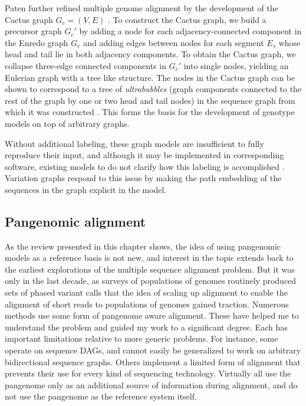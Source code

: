 \documentclass[a4paper,12pt,numbered,oneside]{Classes/PhDThesisPSnPDF}
\begin{document}
Paten further refined multiple genome alignment by the development of the Cactus graph $G_c = (V,E)$ \cite{paten2011cactus}.
To construct the Cactus graph, we build a precursor graph $G_c'$ by adding a node for each adjacency-connected component in the Enredo graph $G_e$ and adding edges between nodes for each segment $E_s$ whose head and tail lie in both adjacency components.
To obtain the Cactus graph, we collapse three-edge connected components in $G_c'$ into single nodes, yielding an Eulerian graph with a tree like structure.
The nodes in the Cactus graph can be shown to correspond to a tree of \emph{ultrabubbles} (graph components connected to the rest of the graph by one or two head and tail nodes) in the sequence graph from which it was constructed \cite{paten2018superbubbles}.
This forms the basis for the development of genotype models on top of arbitrary graphs.

Without additional labeling, these graph models are insufficient to fully reproduce their input, and although it may be implemented in corresponding software, existing models to do not clarify how this labeling is accomplished \cite{kehr2014genome}.
Variation graphs respond to this issue by making the path embedding of the sequences in the graph explicit in the model.

\subsection{Pangenomic alignment}

As the review presented in this chapter shows, the idea of using pangenomic models as a reference basis is not new, and interest in the topic extends back to the earliest explorations of the multiple sequence alignment problem.
But it was only in the last decade, as surveys of populations of genomes routinely produced sets of phased variant calls \cite{liti2009population,weigel20091001,cao2011whole,1000Gphase1,1000g2015} that the idea of scaling up alignment to enable the alignment of short reads to populations of genomes gained traction.
Numerous methods use some form of pangenome aware alignment.
These have helped me to understand the problem and guided my work to a significant degree.
Each has important limitations relative to more generic problems.
For instance, some operate on sequence DAGs, and cannot easily be generalized to work on arbitrary bidirectional sequence graphs.
Others implement a limited form of alignment that prevents their use for every kind of sequencing technology.
Virtually all use the pangenome only as an additional source of information during alignment, and do not use the pangenome as the reference system itself.
\end{document}
